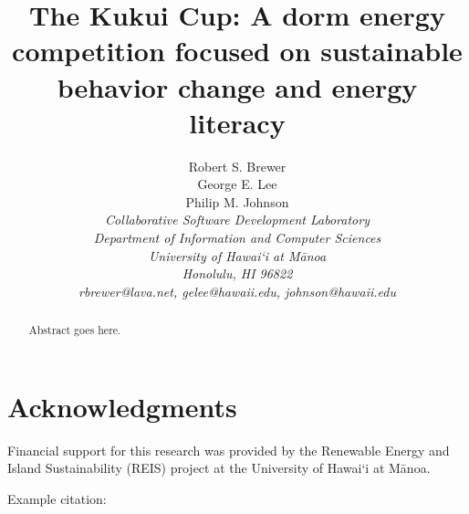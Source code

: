 \documentclass[10pt,conference,peerreview]{IEEEtran}
\begin{document}
\title{The Kukui Cup: A dorm energy competition focused on sustainable behavior change and energy literacy}

\author{Robert S. Brewer\\
        George E. Lee \\
        Philip M. Johnson\\
\em     Collaborative Software Development Laboratory\\
        Department of Information and Computer Sciences\\
        University of Hawai`i at M\=anoa\\
        Honolulu, HI 96822\\
        rbrewer@lava.net, gelee@hawaii.edu, johnson@hawaii.edu\\
}


\IEEEpeerreviewmaketitle

\begin{abstract}  %
Abstract goes here.
\end{abstract}







\section{Acknowledgments}

Financial support for this research was provided by the Renewable Energy and
Island Sustainability (REIS) project at the University of Hawai`i at M\=anoa.

Example citation: \cite{GooglePowerMeter}



\end{document}
